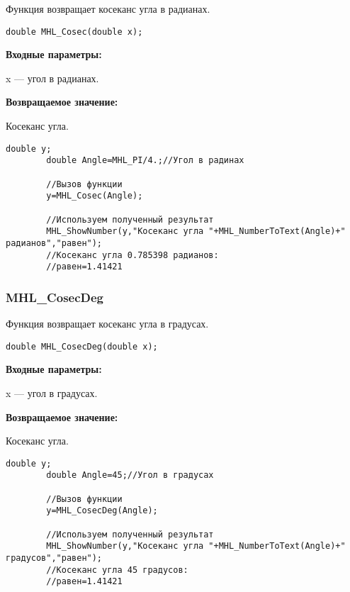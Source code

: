 \documentclass[a4paper,12pt]{article}
\begin{document}
Функция возвращает косеканс угла в радианах.


\begin{lstlisting}[label=code_syntax_MHL_Cosec,caption=Синтаксис]
double MHL_Cosec(double x);
\end{lstlisting}

\textbf{Входные параметры:}

 x --- угол в радианах.

\textbf{Возвращаемое значение:}

Косеканс угла.


\begin{lstlisting}[label=code_use_MHL_Cosec,caption=Пример использования]
        double y;
        double Angle=MHL_PI/4.;//Угол в радинах

        //Вызов функции
        y=MHL_Cosec(Angle);

        //Используем полученный результат
        MHL_ShowNumber(y,"Косеканс угла "+MHL_NumberToText(Angle)+" радианов","равен");
        //Косеканс угла 0.785398 радианов:
        //равен=1.41421
\end{lstlisting}

\subsubsection{MHL\_CosecDeg}\label{MHL_CosecDeg}

Функция возвращает косеканс угла в градусах.


\begin{lstlisting}[label=code_syntax_MHL_CosecDeg,caption=Синтаксис]
double MHL_CosecDeg(double x);
\end{lstlisting}

\textbf{Входные параметры:}

 x --- угол в градусах.

\textbf{Возвращаемое значение:}

Косеканс угла.


\begin{lstlisting}[label=code_use_MHL_CosecDeg,caption=Пример использования]
        double y;
        double Angle=45;//Угол в градусах

        //Вызов функции
        y=MHL_CosecDeg(Angle);

        //Используем полученный результат
        MHL_ShowNumber(y,"Косеканс угла "+MHL_NumberToText(Angle)+" градусов","равен");
        //Косеканс угла 45 градусов:
        //равен=1.41421
\end{lstlisting}
\end{document}
